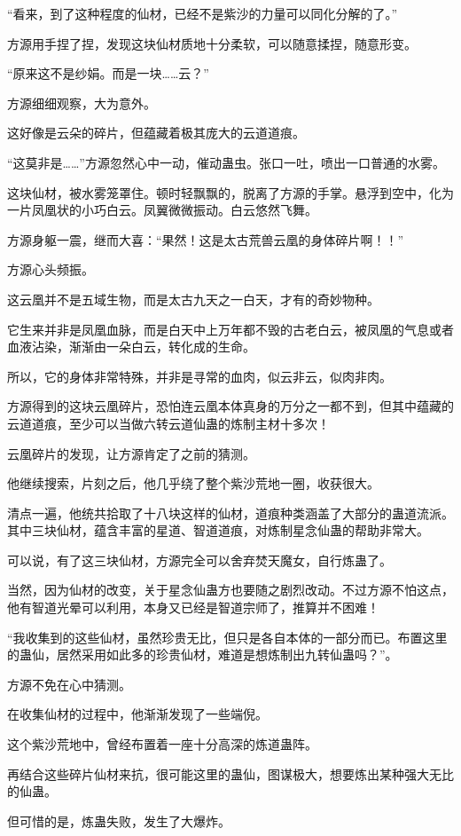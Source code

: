 \begin{this_body}
“看来，到了这种程度的仙材，已经不是紫沙的力量可以同化分解的了。”

方源用手捏了捏，发现这块仙材质地十分柔软，可以随意揉捏，随意形变。

“原来这不是纱娟。而是一块……云？”

方源细细观察，大为意外。

这好像是云朵的碎片，但蕴藏着极其庞大的云道道痕。

“这莫非是……”方源忽然心中一动，催动蛊虫。张口一吐，喷出一口普通的水雾。

这块仙材，被水雾笼罩住。顿时轻飘飘的，脱离了方源的手掌。悬浮到空中，化为一片凤凰状的小巧白云。凤翼微微振动。白云悠然飞舞。

方源身躯一震，继而大喜：“果然！这是太古荒兽云凰的身体碎片啊！！”

方源心头频振。

这云凰并不是五域生物，而是太古九天之一白天，才有的奇妙物种。

它生来并非是凤凰血脉，而是白天中上万年都不毁的古老白云，被凤凰的气息或者血液沾染，渐渐由一朵白云，转化成的生命。

所以，它的身体非常特殊，并非是寻常的血肉，似云非云，似肉非肉。

方源得到的这块云凰碎片，恐怕连云凰本体真身的万分之一都不到，但其中蕴藏的云道道痕，至少可以当做六转云道仙蛊的炼制主材十多次！

云凰碎片的发现，让方源肯定了之前的猜测。

他继续搜索，片刻之后，他几乎绕了整个紫沙荒地一圈，收获很大。

清点一遍，他统共拾取了十八块这样的仙材，道痕种类涵盖了大部分的蛊道流派。其中三块仙材，蕴含丰富的星道、智道道痕，对炼制星念仙蛊的帮助非常大。

可以说，有了这三块仙材，方源完全可以舍弃焚天魔女，自行炼蛊了。

当然，因为仙材的改变，关于星念仙蛊方也要随之剧烈改动。不过方源不怕这点，他有智道光晕可以利用，本身又已经是智道宗师了，推算并不困难！

“我收集到的这些仙材，虽然珍贵无比，但只是各自本体的一部分而已。布置这里的蛊仙，居然采用如此多的珍贵仙材，难道是想炼制出九转仙蛊吗？”。

方源不免在心中猜测。

在收集仙材的过程中，他渐渐发现了一些端倪。

这个紫沙荒地中，曾经布置着一座十分高深的炼道蛊阵。

再结合这些碎片仙材来抗，很可能这里的蛊仙，图谋极大，想要炼出某种强大无比的仙蛊。

但可惜的是，炼蛊失败，发生了大爆炸。


\end{this_body}
